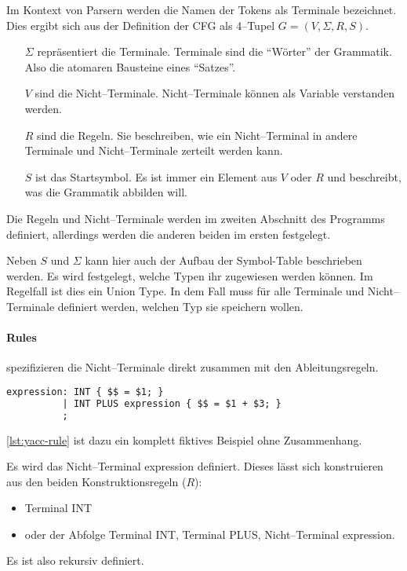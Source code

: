 Im Kontext von Parsern werden die Namen der Tokens als Terminale bezeichnet.
Dies ergibt sich aus der Definition der \ac{CFG} als 4--Tupel $G=(V,\Sigma,R,S)$.~\autocite{sipser-1997}
\begin{itemize}
    \item[$\Sigma$] repräsentiert die Terminale.
    Terminale sind die \enquote{Wörter} der Grammatik.
    Also die atomaren Bausteine eines \enquote{Satzes}.
    \item[$V$] sind die Nicht--Terminale.
    Nicht--Terminale können als Variable verstanden werden.
    \item[$R$] sind die Regeln.
    Sie beschreiben, wie ein Nicht--Terminal in andere Terminale und Nicht--Terminale zerteilt werden kann.
    \item[$S$] ist das Startsymbol.
    Es ist immer ein Element aus $V$ oder $R$ und beschreibt, was die Grammatik abbilden will.
\end{itemize}
Die Regeln und Nicht--Terminale werden im zweiten Abschnitt des Programms definiert, allerdings werden die anderen beiden im ersten festgelegt.

Neben $S$ und $\Sigma$ kann hier auch der Aufbau der Symbol-Table beschrieben werden.
Es wird festgelegt, welche Typen ihr zugewiesen werden können.
Im Regelfall ist dies ein Union Type.
In dem Fall muss für alle Terminale und Nicht--Terminale definiert werden, welchen Typ sie speichern wollen.

\paragraph{Rules} spezifizieren die Nicht--Terminale direkt zusammen mit den Ableitungsregeln.
\begin{lstlisting}[label={lst:yacc-rule},caption={\acs{YACC} Regel},language=yacc]
expression: INT { $$ = $1; }
          | INT PLUS expression { $$ = $1 + $3; }
          ;
\end{lstlisting}
\autoref{lst:yacc-rule} ist dazu ein komplett fiktives Beispiel ohne Zusammenhang.

Es wird das Nicht--Terminal {\ttfamily expression} definiert.
Dieses lässt sich konstruieren aus den beiden Konstruktionsregeln ($R$):
\begin{itemize}
    \item Terminal {\ttfamily INT}
    \item oder der Abfolge Terminal {\ttfamily INT}, Terminal {\ttfamily PLUS}, Nicht--Terminal {\ttfamily expression}.
\end{itemize}
Es ist also rekursiv definiert.

